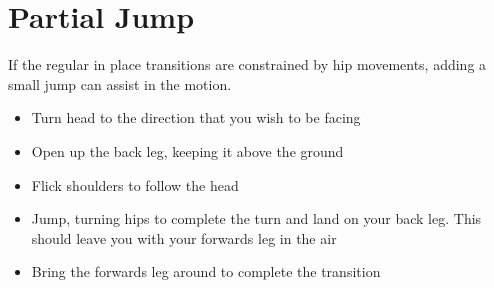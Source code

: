 \section{Partial Jump}
\label{sec:transitions/jump_partial}


If the regular in place transitions are constrained by hip movements, adding a small jump can assist in the motion.   


\begin{itemize}
    \item Turn head to the direction that you wish to be facing
    \item Open up the back leg, keeping it above the ground
    \item Flick shoulders to follow the head  
    \item Jump, turning hips to complete the turn and land on your back leg. This should leave you with your forwards leg in the air  
    \item Bring the forwards leg around to complete the transition  
\end{itemize}
